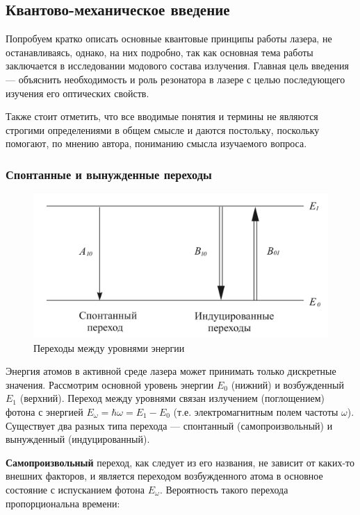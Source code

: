 \documentclass[12pt]{kiarticle}
\begin{document}
\subsection{Квантово-механическое введение}

Попробуем кратко описать основные квантовые принципы работы лазера, не останавливаясь, однако, на них подробно, так как основная тема работы заключается в исследовании модового состава излучения. Главная цель введения --- объяснить необходимость и роль резонатора в лазере с целью последующего изучения его оптических свойств.

 Также стоит отметить, что все вводимые понятия и термины не являются строгими определениями в общем смысле и даются постольку, поскольку помогают, по мнению автора, пониманию смысла изучаемого вопроса. 

\subsubsection{Спонтанные и вынужденные переходы}

\begin{figure} 
	\includegraphics[width=\linewidth]{levels}
	\caption{Переходы между уровнями энергии}
	\label{levels}
\end{figure}

Энергия атомов в активной среде лазера может принимать только дискретные значения. Рассмотрим основной уровень энергии $ E_0 $ (нижний) и возбужденный $ E_1 $ (верхний). Переход между уровнями связан излучением (поглощением) фотона с энергией $ E_\omega = \hbar\omega = E_1 - E_0 $ (т.е. электромагнитным полем частоты $ \omega $). Существует два разных типа перехода --- спонтанный (самопроизвольный) и вынужденный (индуцированный). 

\textbf{Самопроизвольный} переход, как следует из его названия, не зависит от каких-то внешних факторов, и является переходом возбужденного атома в основное состояние с испусканием фотона $ E_\omega $. Вероятность такого перехода пропорциональна времени:
\end{document}
